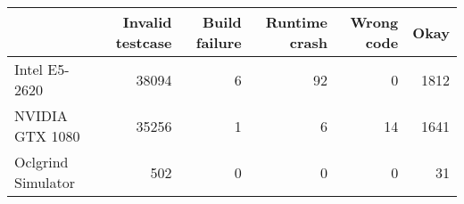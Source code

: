 \begin{tabular}{lrrrrr}
\toprule
{} &  Invalid testcase &  Build failure &  Runtime crash &  Wrong code &  Okay \\
\midrule
Intel E5-2620      &             38094 &              6 &             92 &           0 &  1812 \\
NVIDIA GTX 1080    &             35256 &              1 &              6 &          14 &  1641 \\
Oclgrind Simulator &               502 &              0 &              0 &           0 &    31 \\
\bottomrule
\end{tabular}
